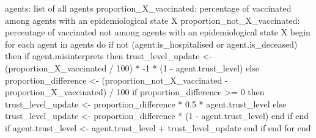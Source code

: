 \begin{algorithm}[language=Pseudocode, caption={Institutional influence over trust}, label={pseudo_code_institutional}]
agents: list of all agents
proportion_X_vaccinated: percentage of vaccinated among agents with an epidemiological state X
proportion_not_X_vaccinated: percentage of vaccinated not among agents with an epidemiological state X
begin
    for each agent in agents do
        if not (agent.is_hospitalised or agent.is_deceased) then
            if agent.misinterprets then
                trust_level_update <- (proportion_X_vaccinated / 100) * -1 * (1 - agent.trust_level)
            else
                proportion_difference <- (proportion_not_X_vaccinated - proportion_X_vaccinated) / 100
                if proportion_difference >= 0 then
                    trust_level_update <- proportion_difference * 0.5 * agent.trust_level
                else
                    trust_level_update <- proportion_difference * (1 - agent.trust_level)
                end if
            end if
            agent.trust_level <- agent.trust_level + trust_level_update
        end if
    end for
end
\end{algorithm}
